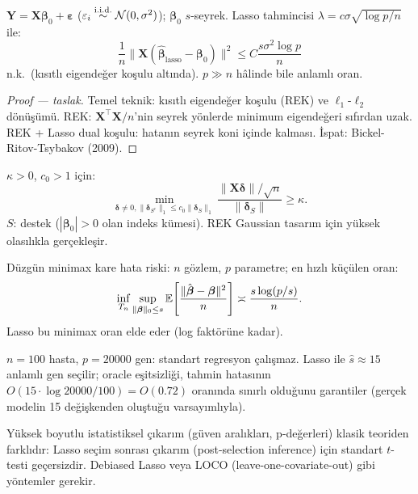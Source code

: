 \begin{teorem}\label{thm:lasso_oracle}
$\mathbf{Y}=\mathbf{X}\boldsymbol\beta_0+\boldsymbol\varepsilon$ ($\varepsilon_i\overset{\text{i.i.d.}}{\sim}\mathcal{N}(0,\sigma^2)$); $\boldsymbol\beta_0$ $s$-seyrek. Lasso tahmincisi $\lambda=c\sigma\sqrt{\log p/n}$ ile:
\[
  \frac{1}{n}\|\mathbf{X}(\hat{\boldsymbol\beta}_{\text{lasso}}-\boldsymbol\beta_0)\|^2 \leq C\frac{s\sigma^2\log p}{n}
\]
n.k.\ (kısıtlı eigendeğer koşulu altında). $p\gg n$ hâlinde bile anlamlı oran.
\end{teorem}

\begin{proof}[Proof --- taslak]
Temel teknik: kısıtlı eigendeğer koşulu (REK) ve $\ell_1$-$\ell_2$ dönüşümü. REK: $\mathbf{X}^\top\mathbf{X}/n$'nin seyrek yönlerde minimum eigendeğeri sıfırdan uzak. REK + Lasso dual koşulu: hatanın seyrek koni içinde kalması. İspat: Bickel-Ritov-Tsybakov (2009).
\end{proof}

\begin{tanim}\label{def:rek}
$\kappa>0$, $c_0>1$ için:
\[
  \min_{\boldsymbol\delta\neq0,\|\boldsymbol\delta_{S^c}\|_1\leq c_0\|\boldsymbol\delta_S\|_1} \frac{\|\mathbf{X}\boldsymbol\delta\|/\sqrt{n}}{\|\boldsymbol\delta_S\|} \geq \kappa.
\]
$S$: destek ($|\boldsymbol\beta_0|>0$ olan indeks kümesi). REK Gaussian tasarım için yüksek olasılıkla gerçekleşir.
\end{tanim}

\begin{teorem}\label{thm:boyutsallik}
Düzgün minimax kare hata riski: $n$ gözlem, $p$ parametre; en hızlı küçülen oran:
\[
  \inf_{T_n}\sup_{\|\boldsymbol\beta\|_0\leq s} \mathbb{E}\!\left[\frac{\|\hat{\boldsymbol\beta}-\boldsymbol\beta\|^2}{n}\right] \asymp \frac{s\log(p/s)}{n}.
\]
Lasso bu minimax oran elde eder (log faktörüne kadar).
\end{teorem}

\begin{ornek}
$n=100$ hasta, $p=20000$ gen: standart regresyon çalışmaz. Lasso ile $\hat{s}\approx15$ anlamlı gen seçilir; oracle eşitsizliği, tahmin hatasının $O(15\cdot\log 20000/100)=O(0.72)$ oranında sınırlı olduğunu garantiler (gerçek modelin 15 değişkenden oluştuğu varsayımlıyla).
\end{ornek}

\begin{hataanalizi}
Yüksek boyutlu istatistiksel çıkarım (güven aralıkları, p-değerleri) klasik teoriden farklıdır: Lasso seçim sonrası çıkarım (post-selection inference) için standart $t$-testi geçersizdir. Debiased Lasso veya LOCO (leave-one-covariate-out) gibi yöntemler gerekir.
\end{hataanalizi}

